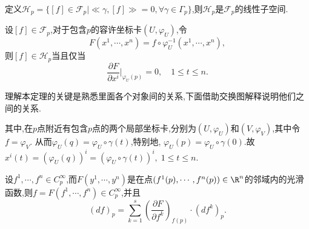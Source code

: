 定义$\mathscr{H}_p=\{[f]\in\mathscr{F}_p| \ll \gamma,[f]\gg=0,\forall \gamma\in \Gamma_p\}$,则$\mathscr{H}_p$是$\mathscr{F}_p$的线性子空间.

\begin{theorem}
设$[f]\in\mathscr{F}_p$,对于包含$p$的容许坐标卡$(U,\varphi_U)$,令
\begin{equation*}
F(x^1,\cdots,x^n)=f\circ\varphi_U^{-1}(x^1,\cdots,x^n),
\end{equation*}
则$[f]\in\mathscr{H}_p$当且仅当
\begin{equation*}
\frac{\partial F}{\partial x^i}\Bigg|_{\varphi_U(p)}=0,\quad 1\leqslant t\leqslant n.
\end{equation*}
\end{theorem}

\begin{remark}
理解本定理的关键是熟悉里面各个对象间的关系,下面借助交换图解释说明他们之间的关系.
\begin{center}
\end{center}
其中,在$p$点附近有包含$p$点的两个局部坐标卡,分别为$(U,\varphi_U)$和$(V,\varphi_V)$,其中令$f=\varphi_V$.
从而$\varphi_U(q)=\varphi_U\circ \gamma(t)$,特别地, $\varphi_U(p)=\varphi_U\circ \gamma(0)$.故$x^i (t)=\left(\varphi_U(q)\right)^i=\left(\varphi_U\circ \gamma(t)\right)^i,\; 1\leqslant t\leqslant n$.
\end{remark}

\begin{theorem}[][][thm:1.22]
设$f^1,\cdots,f^n\in C_p^\infty$,而$F(y^1,\cdots,y^n)$是在点$(f^1(p),\cdots,f^n(p))\in \R^n$的邻域内的光滑函数,则$f=F(f^1,\cdots,f^n)\in C_p^\infty$,并且
\begin{equation*}
(df)_p=\sum_{k=1}^{s}\left(\frac{\partial F}{\partial f^k}\right)_{f(p)}\cdot (df^k)_p.
\end{equation*}
\end{theorem}

